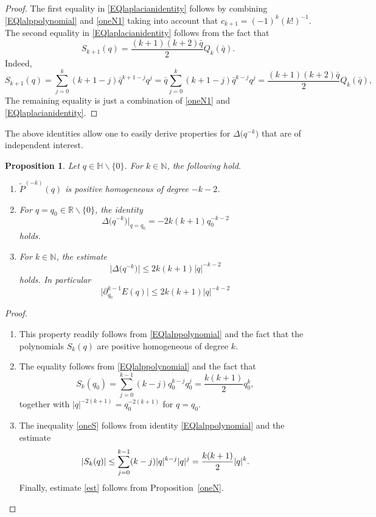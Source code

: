 \documentclass[reqno,11pt]{amsart}
\newtheorem{proposition}[theorem]{Proposition}
\theoremstyle{definition}
\begin{document}
\begin{proof}
The first equality in \eqref{EQlaplacianidentity} follows by combining \eqref{EQlalppolynomial} and \eqref{oneN1} taking into account that $c_{k+1}=(-1)^k (k!)^{-1}$. The second equality in \eqref{EQlaplacianidentity} follows from the fact that
\[
S_{k+1}(q) = \frac{(k+1)(k+2)\bar{q}}{2}Q_k(\bar{q}).
\]
Indeed,
\[
S_{k+1}(q)= \sum_{j=0}^{k} (k+1-j)\bar{q}^{k+1-j}q^j = \bar{q} \sum_{j=0}^{k} (k+1-j)\bar{q}^{k-j}q^j = \frac{(k+1)(k+2)\bar{q}}{2}Q_k(\bar{q}),
\]
The remaining equality is just a combination of \eqref{oneN1} and \eqref{EQlaplacianidentity}.
\end{proof}
The above identities allow one to easily derive properties for $\Delta \big(q^{-k}\big)$ that are of independent interest.

\begin{proposition}
	\label{prop}
	Let $q \in \mathbb{H} \backslash \{0\}$. For $k\in \mathbb{N}$, the following hold.
	\begin{enumerate}[label=\textnormal{(\roman{*})}]
		\item $\widetilde{P}^{(-k)}(q)$ is positive homogeneous of degree $-k-2$.
		\item For $q=q_0\in \mathbb{R}\backslash \{0\}$, the identity
		\begin{equation}
			\label{ide}
			\Delta \big(q^{-k}\big)\big|_{q=q_0}=-2k(k+1)q_0^{-k-2}
		\end{equation}
		holds.
		\item For $k \in \mathbb{N}$, the estimate
		\begin{equation}
		\label{oneS}
			\big|\Delta \big(q^{-k}\big)\big| \leq 2 k(k+1)|q|^{-k-2}
		\end{equation}
		holds. In particular
		\begin{equation}
			\label{est}
			\big | \partial_{q_0}^{k-1}E(q)\big| \leq 2 k(k+1)|q|^{-k-2}
		\end{equation}
	\end{enumerate}
\end{proposition}
\begin{proof}
	\begin{enumerate}[wide,label=\textnormal{(\roman{*})}]
		\item This property readily follows from \eqref{EQlalppolynomial} and the fact that the polynomials $S_{k}(q)$ are positive homogeneous of degree $k$.
		
	
		\item The equality follows from \eqref{EQlalppolynomial} and the fact that
		\[
		 S_k(q_0)= \sum_{j=0}^{k-1} (k-j)q_0^{k-j}q_0^j = \frac{k(k+1)}{2}q_0^k,
		\]
		together with $|q|^{-2(k+1)}=q_0^{-2(k+1)}$ for $q=q_0$.
		
		\item The inequality \eqref{oneS}  follows from identity \eqref{EQlalppolynomial} and the estimate
		\[
		|S_k(q)|\leq \sum_{j=0}^{k-1} (k-j)|q|^{k-j}|q|^j =\frac{k(k+1)}{2} |q|^k .\qedhere
		\]
Finally, estimate \eqref{est} follows from Proposition~\ref{oneN}.
	\end{enumerate}
\end{proof}
\end{document}
